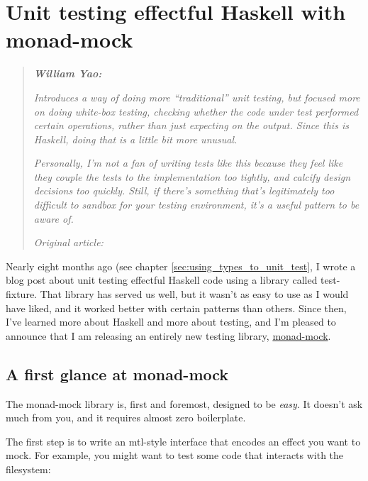 \chapter{Unit testing effectful Haskell with monad-mock}

\begin{quotation}
\noindent\textit{\textbf{William Yao:}}

\textit{Introduces a way of doing more “traditional” unit testing, but focused more on doing white-box testing, checking whether the code under test performed certain operations, rather than just expecting on the output. Since this is Haskell, doing that is a little bit more unusual.}

\textit{Personally, I'm not a fan of writing tests like this because they feel like they couple the tests to the implementation too tightly, and calcify design decisions too quickly. Still, if there's something that's legitimately too difficult to sandbox for your testing environment, it's a useful pattern to be aware of.}

\vspace{\baselineskip}

\noindent\textit{Original article: \cite{unit_testing_monad_mock}}
\end{quotation}


\noindent Nearly eight months ago (see chapter \ref{sec:using_types_to_unit_test},
I wrote a blog post about unit testing effectful Haskell code using a
library called test-fixture. That library has served us well, but it
wasn't as easy to use as I would have liked, and it worked better with
certain patterns than others. Since then, I've learned more about
Haskell and more about testing, and I'm pleased to announce that I am
releasing an entirely new testing library,
\href{https://hackage.haskell.org/package/monad-mock}{monad-mock}.

\section{A first glance at
monad-mock}\label{a-first-glance-at-monad-mock}

The monad-mock library is, first and foremost, designed to be
\emph{easy}. It doesn't ask much from you, and it requires almost zero
boilerplate.

The first step is to write an mtl-style interface that encodes an effect
you want to mock. For example, you might want to test some code that
interacts with the filesystem:

